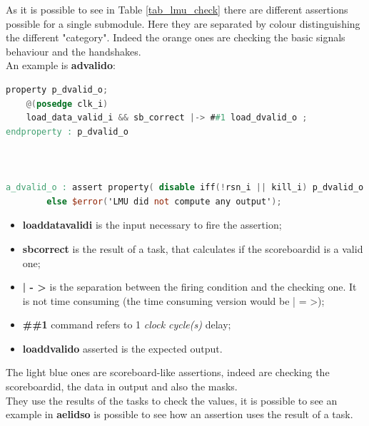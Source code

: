 As it is possible to see in Table \ref{tab_lmu_check} there are different assertions possible for a single submodule. 
Here they are separated by colour distinguishing the different "category".
Indeed the orange ones are checking the basic signals behaviour and the handshakes.\\
An example is \textbf{a\+dvalid\+o}:
\bigskip

\begin{lstlisting}[language=Verilog,style=verilog-style]
property p_dvalid_o;
	@(posedge clk_i)
	load_data_valid_i && sb_correct |-> ##1 load_dvalid_o ;
endproperty : p_dvalid_o



a_dvalid_o : assert property( disable iff(!rsn_i || kill_i) p_dvalid_o ) 
        else $error('LMU did not compute any output');

\end{lstlisting}
\bigskip
\begin{itemize}
    \item \textbf{load\+data\+valid\+i} is the input necessary to fire the assertion;
    
    \item \textbf{sb\+correct} is the result of a task, that calculates if the scoreboard\+id is a valid one;
    
    \item \textbf{| - >} is the separation between the firing condition and the checking one. It is not time consuming (the time consuming version would be | = >);
    
    \item \textbf{\#\#1} command refers to 1 \textit{clock cycle(s)} delay;
    
    \item \textbf{load\+dvalid\+o} asserted is the expected output.
\end{itemize}

The light blue ones are scoreboard-like assertions, indeed are checking the scoreboard\+id, the data in output and also the masks.\\
They use the results of the tasks to check the values, it is possible to see an example in \textbf{a\+el\+ids\+o} is possible to see how an assertion uses the result of a task.
\bigskip

